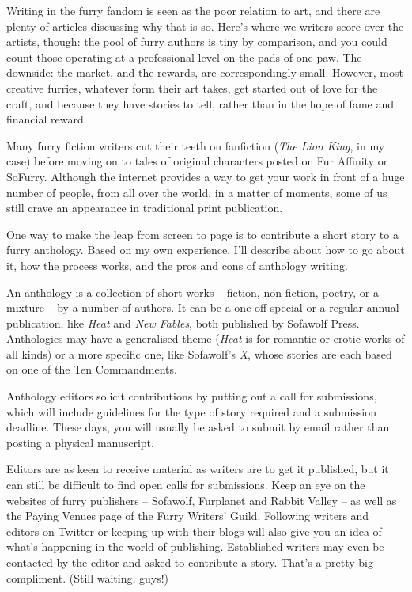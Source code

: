 
Writing in the furry fandom is seen as the poor relation to art, and there are plenty of articles discussing why that is so. Here's where we writers score over the artists, though: the pool of furry authors is tiny by comparison, and you could count those operating at a professional level on the pads of one paw. The downside: the market, and the rewards, are correspondingly small. However, most creative furries, whatever form their art takes, get started out of love for the craft, and because they have stories to tell, rather than in the hope of fame and financial reward.

Many furry fiction writers cut their teeth on fanfiction (\textit{The Lion King}, in my case) before moving on to tales of original characters posted on Fur Affinity or SoFurry. Although the internet provides a way to get your work in front of a huge number of people, from all over the world, in a matter of moments, some of us still crave an appearance in traditional print publication.

One way to make the leap from screen to page is to contribute a short story to a furry anthology. Based on my own experience, I'll describe about how to go about it, how the process works, and the pros and cons of anthology writing.

An anthology is a collection of short works -- fiction, non-fiction, poetry, or a mixture -- by a number of authors. It can be a one-off special or a regular annual publication, like \textit{Heat} and \textit{New Fables}, both published by Sofawolf Press. Anthologies may have a generalised theme (\textit{Heat} is for romantic or erotic works of all kinds) or a more specific one, like Sofawolf's \textit{X}, whose stories are each based on one of the Ten Commandments.

Anthology editors solicit contributions by putting out a call for submissions, which will include guidelines for the type of story required and a submission deadline. These days, you will usually be asked to submit by email rather than posting a physical manuscript.

Editors are as keen to receive material as writers are to get it published, but it can still be difficult to find open calls for submissions. Keep an eye on the websites of furry publishers -- Sofawolf, Furplanet and Rabbit Valley -- as well as the Paying Venues page of the Furry Writers' Guild. Following writers and editors on Twitter or keeping up with their blogs will also give you an idea of what's happening in the world of publishing. Established writers may even be contacted by the editor and asked to contribute a story. That's a pretty big compliment. (Still waiting, guys!)

